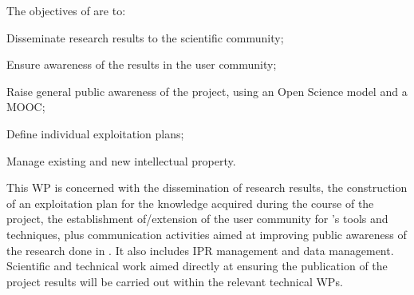 \addtocounter{wpno}{1}
\begin{Workpackage}{\thewpno}
\WPTitle{\wpname{\thewpno}}

\begin{WPObjectives}
The objectives of \theWP{} are to:
\begin{compactitem}
  \item Disseminate research results to the scientific community;
  \item Ensure awareness of the results in the user community;
  \item Raise general public awareness of the \TheProject{} project, using an Open Science model and a MOOC;
  \item Define individual exploitation plans;
  \item Manage existing and new intellectual property.
\end{compactitem}
\end{WPObjectives}

\begin{WPDescription}
This WP is concerned with the dissemination of research results, the construction of an exploitation plan for the knowledge acquired during the course of the \TheProject{} project, 
the establishment of/extension of the user community for \TheProject{}'s tools and techniques,
plus communication activities aimed at improving public awareness of the research done in \TheProject{}.
It also includes IPR management and data management.
Scientific and technical work aimed directly at ensuring the publication of the project results will be carried out within the relevant technical WPs.
\end{WPDescription}

\begin{Task}


\end{Task}
\end{Workpackage}
